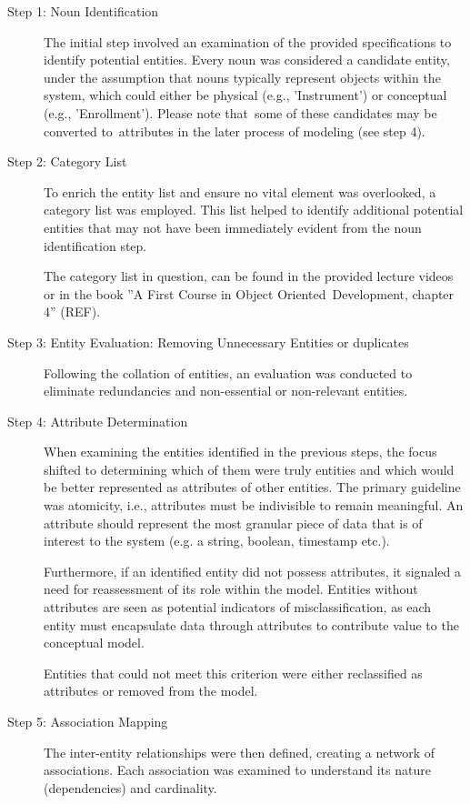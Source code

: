 \documentclass[a4paper]{scrartcl}
\begin{document}
\begin{description}
  \item[Step 1: Noun Identification] 
  The initial step involved an examination of the provided specifications to
  identify potential entities. Every noun was considered a candidate entity,
  under the assumption that nouns typically represent objects within the system,
  which could either be physical (e.g., 'Instrument') or conceptual (e.g.,
  'Enrollment'). Please note that some of these candidates may be converted
  to attributes in the later process of modeling (see step 4).

  \item[Step 2: Category List] To enrich the entity list and ensure no vital
  element was overlooked, a category list was employed. This list helped to
  identify additional potential entities that may not have been immediately
  evident from the noun identification step.
  
  The category list in question, can be found in the provided lecture videos or
  in the book ''A First Course in Object Oriented Development, chapter 4''
  (REF).

  \item[Step 3: Entity Evaluation: Removing Unnecessary Entities or duplicates]
  Following the collation of entities, an evaluation was conducted to eliminate
  redundancies and non-essential or non-relevant entities.

  \item[Step 4: Attribute Determination]
  When examining the entities identified in the previous steps, the focus
  shifted to determining which of them were truly entities and which would be
  better represented as attributes of other entities. 
  The primary guideline was atomicity, i.e., attributes must be indivisible to
  remain meaningful. 
  An attribute should represent the most granular piece of data that is of
  interest to the system (e.g. a string, boolean, timestamp etc.).

  Furthermore, if an identified entity did not possess attributes, it signaled a
  need for reassessment of its role within the model. Entities without
  attributes are seen as potential indicators of misclassification, as each
  entity must encapsulate data through attributes to contribute value to the
  conceptual model.

  Entities that could not meet this criterion were either reclassified as
  attributes or removed from the model. 

  \item[Step 5: Association Mapping]
  The inter-entity relationships were then defined, creating a network of
  associations. Each association was examined to understand its nature
  (dependencies) and cardinality.


\end{description}
\end{document}
